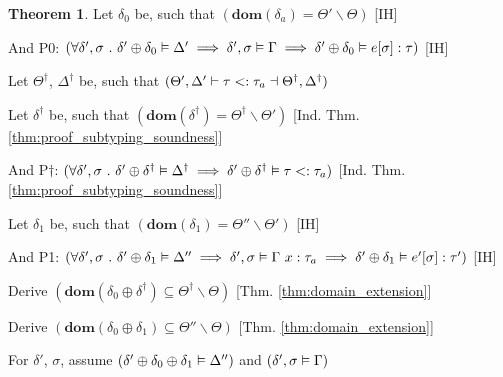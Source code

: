 \documentclass[acmsmall]{acmart}
\theoremstyle{definition}
\newtheorem{theorem}{Theorem}[section]
\begin{document}
\begin{theorem}
  \item \I \N Let $\delta_0$ be, such that $(
    \textbf{dom}(\delta_a) = \Theta' \backslash \Theta
  )$ [IH]
  \item \I \N And P0: $(
    \forall \delta', \sigma \ .\  
    \delta' \oplus \delta_0 \vDash \Delta' \implies
    \delta', \sigma \vDash \Gamma \implies
    \delta' \oplus \delta_0 \vDash e[\sigma] : \tau
  )$ [IH]

  \item \I \N Let $\Theta^\dagger$, $\Delta^\dagger$ be, such that $(
    \Theta', \Delta' \vdash \tau <: \tau_a \dashv \Theta^\dagger, \Delta^\dagger
  )$

  \item \I \N Let $\delta^\dagger$ be, such that $(
    \textbf{dom}(\delta^\dagger) = \Theta^\dagger \backslash \Theta'
  )$ [Ind. Thm. \ref{thm:proof_subtyping_soundness}]
  \item \I \N And P$\dagger$: $(
    \forall \delta', \sigma \ .\  
    \delta' \oplus \delta^\dagger \vDash \Delta^\dagger \implies
    \delta' \oplus \delta^\dagger \vDash \tau <: \tau_a
  )$ [Ind. Thm. \ref{thm:proof_subtyping_soundness}]

  \item \I \N Let $\delta_1$ be, such that $(
    \textbf{dom}(\delta_1) = \Theta'' \backslash \Theta'
  )$ [IH]
  \item \I \N And P1: $(
    \forall \delta', \sigma \ .\  
    \delta' \oplus \delta_1 \vDash \Delta'' \implies
    \delta', \sigma \vDash \Gamma\ x : \tau_a \implies
    \delta' \oplus \delta_1 \vDash e'[\sigma] : \tau'
  )$ [IH]


  \item \I \N Derive $(
    \textbf{dom}(\delta_0 \oplus \delta^\dagger) \subseteq \Theta^\dagger \backslash \Theta
  )$ [Thm. \ref{thm:domain_extension}]

  \item \I \N Derive $(
    \textbf{dom}(\delta_0 \oplus \delta_1) \subseteq \Theta'' \backslash \Theta
  )$ [Thm. \ref{thm:domain_extension}]


  \item \I \N For $\delta'$, $\sigma$,
    assume $(\delta' \oplus \delta_0 \oplus \delta_1 \vDash \Delta'')$
    and $(\delta', \sigma \vDash \Gamma)$


\end{theorem}
\end{document}
